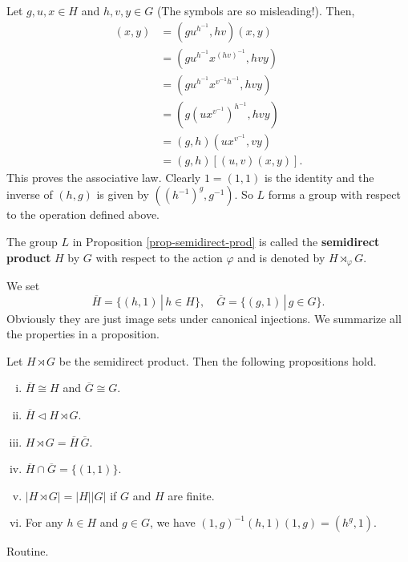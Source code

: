 \begin{sketch}
	Let $g, u, x \in H$ and $h, v, y \in G$ (The symbols are so misleading!). Then,
	\begin{align*}
		[(g, h)(u, v)](x, y) &= (gu^{h^{-1}},hv)(x, y) \\
		&= (gu^{h^{-1}}x^{(hv)^{-1}},hvy)
		\\
		&= (gu^{h^{-1}}x^{v^{-1}h^{-1}},hvy)
		\\
		&= (g(ux^{v^{-1}})^{h^{-1}},hvy)
		\\
		&= (g,h)(ux^{v^{-1}},vy)
		\\
		&=  (g, h)[(u, v)(x, y)].
	\end{align*}
	This proves the associative law. Clearly $1 = (1, 1)$ is the identity and the inverse of $(h, g)$ is given by $((h^{-1})^{g}, g^{-1})$. So $L$ forms a group with respect to the operation defined above.
\end{sketch}


\begin{definition}
	The group $L$ in Proposition \ref{prop-semidirect-prod} is called the \textbf{semidirect product} $H$ by $G$ with respect to the action $\varphi$ and is denoted by $H\rtimes_{\varphi} G$.
\end{definition}
 
 We set
$$\overline{H} = \{(h,1) \,|\, h \in H\},\quad\overline{G} = \{(g,1)\,|\, g \in G\}.$$
Obviously they are just image sets under canonical injections.  We summarize all the properties in a proposition.
\begin{proposition} \label{prop-semidirect-prod-properties}
	Let $H \rtimes G$ be the semidirect product. Then the following propositions hold.
	\begin{enumerate}[(i)]
		\item $\overline{H} \cong H$ and $\overline{G}\cong G$.
		\item $\overline{H} \lhd  H \rtimes G$.
		\item $H \rtimes G= \overline{H}\,\overline{G}$.
		\item $\overline{H} \cap \overline{G} = \{(1,1)\}$.
		\item $|H \rtimes G| = |H|  |G|$ if $G$ and $H$ are finite.
		\item For any $h \in H$ and $g \in G$, we have $(1,g)^{-1}(h,1)(1,g) = (h^g,1)$.
	\end{enumerate}
\end{proposition} 
\begin{sketch}
	Routine.
\end{sketch}

